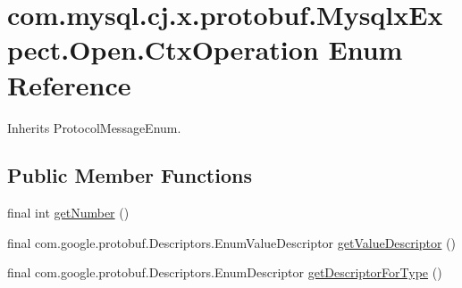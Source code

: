 \hypertarget{enumcom_1_1mysql_1_1cj_1_1x_1_1protobuf_1_1_mysqlx_expect_1_1_open_1_1_ctx_operation}{}\section{com.\+mysql.\+cj.\+x.\+protobuf.\+Mysqlx\+Expect.\+Open.\+Ctx\+Operation Enum Reference}
\label{enumcom_1_1mysql_1_1cj_1_1x_1_1protobuf_1_1_mysqlx_expect_1_1_open_1_1_ctx_operation}


Inherits Protocol\+Message\+Enum.

\subsection*{Public Member Functions}
\begin{DoxyCompactItemize}
\item 
final int \mbox{\hyperlink{enumcom_1_1mysql_1_1cj_1_1x_1_1protobuf_1_1_mysqlx_expect_1_1_open_1_1_ctx_operation_ad3133f273b8e3b47333269429b6bc0e3}{get\+Number}} ()
\item 
final com.\+google.\+protobuf.\+Descriptors.\+Enum\+Value\+Descriptor \mbox{\hyperlink{enumcom_1_1mysql_1_1cj_1_1x_1_1protobuf_1_1_mysqlx_expect_1_1_open_1_1_ctx_operation_a4619c15662863227c70347f5f4810cb9}{get\+Value\+Descriptor}} ()
\item 
final com.\+google.\+protobuf.\+Descriptors.\+Enum\+Descriptor \mbox{\hyperlink{enumcom_1_1mysql_1_1cj_1_1x_1_1protobuf_1_1_mysqlx_expect_1_1_open_1_1_ctx_operation_ad161dfef5abfdefe5940e32fd86b5fa7}{get\+Descriptor\+For\+Type}} ()
\end{DoxyCompactItemize}

